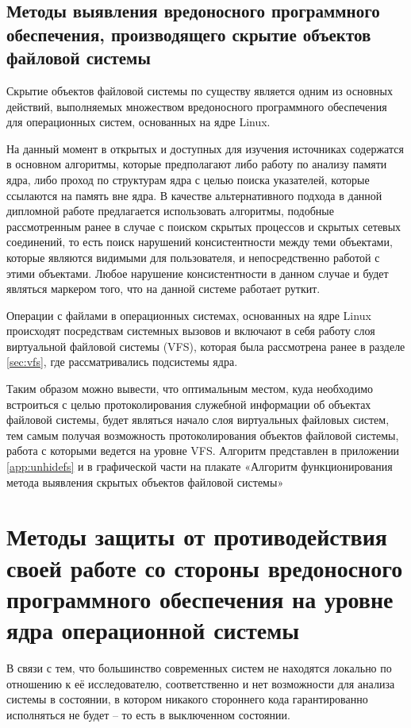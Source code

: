 \documentclass{gost7.32-2001}
\begin{document}
\subsection{Методы выявления вредоносного программного обеспечения, производящего скрытие объектов файловой системы}
Скрытие объектов файловой системы по существу является одним из
основных действий, выполняемых множеством вредоносного программного
обеспечения для операционных систем, основанных на ядре Linux.

На данный момент в открытых и доступных для изучения источниках
содержатся в основном алгоритмы, которые предполагают либо работу по
анализу памяти ядра, либо проход по структурам ядра с целью поиска
указателей, которые ссылаются на память вне ядра. В качестве
альтернативного подхода в данной дипломной работе предлагается
использовать алгоритмы, подобные рассмотренным ранее в случае с
поиском скрытых процессов и скрытых сетевых соединений, то есть поиск
нарушений консистентности между теми объектами, которые являются
видимыми для пользователя, и непосредственно работой с этими
объектами. Любое нарушение консистентности в данном случае и будет
являться маркером того, что на данной системе работает руткит.

Операции с файлами в операционных системах, основанных на ядре Linux
происходят посредствам системных вызовов и включают в себя работу слоя
виртуальной файловой системы (VFS), которая была рассмотрена ранее в
разделе \ref{sec:vfs}, где рассматривались подсистемы ядра.

Таким образом можно вывести, что оптимальным местом, куда необходимо
встроиться с целью протоколирования служебной информации об объектах
файловой системы, будет являться начало слоя виртуальных файловых
систем, тем самым получая возможность протоколирования объектов
файловой системы, работа с которыми ведется на уровне VFS. Алгоритм
представлен в приложении \ref{app:unhidefs} и в графической части на
плакате «Алгоритм функционирования метода выявления скрытых объектов
файловой системы»

\newpage
\section{Методы защиты от противодействия своей работе со стороны вредоносного программного обеспечения на уровне ядра операционной системы}

В связи с тем, что большинство современных систем не находятся
локально по отношению к её исследователю, соответственно и нет
возможности для анализа системы в состоянии, в котором никакого
стороннего кода гарантированно исполняться не будет – то есть в
выключенном состоянии. 
\end{document}
